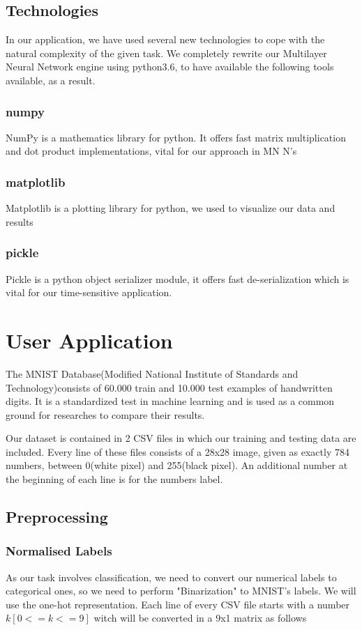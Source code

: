 \documentclass{proc}
\begin{document}
	\subsection{Technologies}
	In our application, we have used several new technologies to cope with the natural complexity of the given task. We completely rewrite our Multilayer Neural Network engine using python3.6, to have available the following tools available, as a result.
	\subsubsection{numpy}
	NumPy is a mathematics library for python. It offers fast matrix multiplication and dot product implementations, vital for our approach in MN N's
	\subsubsection{matplotlib}
	Matplotlib is a plotting library for python, we used to visualize our data and results
	\subsubsection{pickle}
	Pickle is a python object serializer module, it offers fast de-serialization which is vital for our time-sensitive application.	
	\section{User Application}
	The MNIST Database(Modified National Institute of Standards and Technology)consists of 60.000 train and 10.000 test examples of handwritten digits. It is a standardized test in machine learning and is used as a common ground for researches to compare their results.
	
	Our dataset is contained in 2 CSV files in which our training and testing data are included. Every line of these files consists of a 28x28 image, given as exactly 784 numbers, between 0(white pixel) and 255(black pixel). An additional number at the beginning of each line is for the numbers label.
	\subsection{Preprocessing}
	\subsubsection{Normalised Labels}
	As our task involves classification, we need to convert our numerical labels to categorical ones, so we need to perform "Binarization" to MNIST's labels. We will use the one-hot representation. Each line of every CSV file starts with a number ${k[0<=k<=9]}$ witch will be converted in a 9x1 matrix as follows
	
\end{document}
